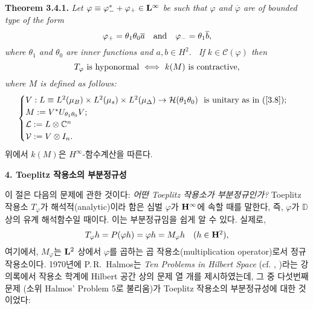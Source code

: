 \documentclass[12pt,a4paper,2sided]{article}
\begin{document}
\newpage{} \vspace{0.8cm}

{\bf Theorem 3.4.1.} {\rm \cite{CHL1}} {\sl Let $\varphi\equiv
\varphi_-^*+\varphi_+\in \bold L^\infty$ be such that $\varphi$
and $\overline\varphi$ are of bounded type of the form
$$
\varphi_+=\theta_1\theta_0\overline a\quad\hbox{and}\quad
\varphi_-=\theta_1\overline b,
$$
where $\theta_1$ and $\theta_0$ are inner functions and $a,b\in
H^2$. \  If $k\in\mathcal{C}(\varphi)$ then
$$
T_\varphi\ \hbox{is hyponormal}\ \Longleftrightarrow\ k(M)\ \hbox{is
contractive},
$$
where $M$ is defined as follows:
\begin{equation}\label{3.10}
\begin{cases}
V: L\equiv L^2(\mu_B) \times L^2(\mu_s)
         \times L^2(\mu_{\Delta})\to \mathcal H(\theta_1 \theta_0)\ \
            \hbox{\rm is unitary as in (\ref{3.8})};\\
M:= V^*U_{\theta_1\theta_0}V;\\
\mathcal L :=L \otimes \mathbb C^n\\
\mathcal V := V \otimes I_n.
\end{cases}
\end{equation}}
위에서 $k(M)$은 $H^\infty$-함수계산을 따른다.



\vspace{.8 cm} {\large\bf 4. Toeplitz 작용소의 부분정규성}

\vspace{.5 cm}


이 절은 다음의 문제에 관한 것이다: {\it 어떤 Toeplitz 작용소가
부분정규인가?} Toeplitz 작용소 $T_\varphi$가 해석적(analytic)이라
함은 심벌 $\varphi$가 $\bold H^\infty$에 속할 때를 말한다, 즉,
$\varphi$가 $\mathbb{D}$ 상의 유계 해석함수일 때이다. 이는
부분정규임을 쉽게 알 수 있다. 실제로,
$$
T_\varphi h=P(\varphi h)=\varphi h=M_\varphi h\quad \hbox{($h\in \bold H^2$)},
$$
여기에서, $M_\varphi$는   $\bold L^2$ 상에서 $\varphi$를 곱하는 곱
작용소(multiplication operator)로서 정규작용소이다. 1970년에
P.\,R.\ Halmos는 {\it Ten Problems in Hilbert Space} (cf.
\cite{Ha1}, \cite{Ha2})라는 강의록에서 작용소 학계에  Hilbert 공간
상의 문제 열 개를 제시하였는데, 그 중 다섯번째 문제 (소위 Halmos'
Problem 5로 불리움)가 Toeplitz 작용소의 부분정규성에 대한
것이었다:
\end{document}
